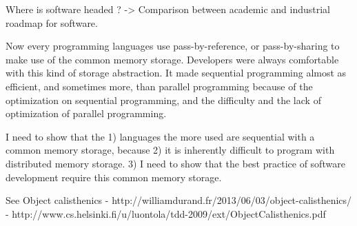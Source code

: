Where is software headed ? \cite{Lewis1995}
-> Comparison between academic and industrial roadmap for software.

Now every programming languages use pass-by-reference, or pass-by-sharing to make use of the common memory storage.
Developers were always comfortable with this kind of storage abstraction.
It made sequential programming almost as efficient, and sometimes more, than parallel programming because of the optimization on sequential programming, and the difficulty and the lack of optimization of parallel programming.



I need to show that the 1) languages the more used are sequential with a common memory storage, because 2) it is inherently difficult to program with distributed memory storage.
3) I need to show that the best practice of software development require this common memory storage.

See Object calisthenics 
- http://williamdurand.fr/2013/06/03/object-calisthenics/
- http://www.cs.helsinki.fi/u/luontola/tdd-2009/ext/ObjectCalisthenics.pdf